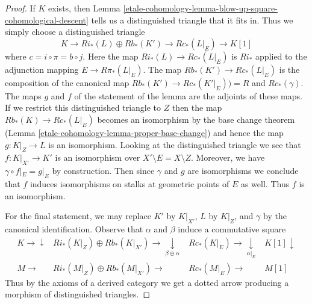 \begin{proof}
If $K$ exists, then Lemma \ref{etale-cohomology-lemma-blow-up-square-cohomological-descent}
tells us a distinguished triangle that it fits in. Thus we simply choose
a distinguished triangle
$$
K \to Ri_*(L) \oplus Rb_*(K') \to Rc_*(L|_E) \to K[1]
$$
where $c = i \circ \pi = b \circ j$. Here the map $Ri_*(L) \to Rc_*(L|_E)$
is $Ri_*$ applied to the adjunction mapping $E \to R\pi_*(L|_E)$.
The map $Rb_*(K') \to Rc_*(L|_E)$ is the composition of the canonical map
$Rb_*(K') \to Rc_*(K'|_E)) = R$ and $Rc_*(\gamma)$.
The maps $g$ and $f$ of the statement of the lemma are the adjoints
of these maps. If we restrict this distinguished triangle to $Z$
then the map $Rb_*(K) \to Rc_*(L|_E)$ becomes an isomorphism
by the base change theorem (Lemma \ref{etale-cohomology-lemma-proper-base-change}) and hence
the map $g : K|_Z \to L$ is an isomorphism.
Looking at the distinguished triangle we see that $f : K|_{X'} \to K'$
is an isomorphism over $X' \setminus E = X \setminus Z$.
Moreover, we have $\gamma \circ f|_E = g|_E$ by construction.
Then since $\gamma$ and $g$ are isomorphisms we conclude
that $f$ induces isomorphisms on stalks at geometric points of $E$
as well. Thus $f$ is an isomorphism.

\medskip\noindent
For the final statement, we may replace $K'$ by $K|_{X'}$,
$L$ by $K|_Z$, and $\gamma$ by the canonical identification.
Observe that $\alpha$ and $\beta$ induce a commutative square
$$
\begin{array}{cccc}K \longrightarrow\downarrow & Ri_*(K|_Z) \oplus Rb_*(K|_{X'}) \longrightarrow\underset{\beta \oplus \alpha}{\downarrow} & Rc_*(K|_E) \longrightarrow\underset{\alpha|_E}{\downarrow} & K[1] \downarrow \\ M \longrightarrow & Ri_*(M|_Z) \oplus Rb_*(M|_{X'}) \longrightarrow & Rc_*(M|_E) \longrightarrow & M[1]\end{array}
$$
Thus by the axioms of a derived category we get a dotted
arrow producing a morphism of distinguished triangles.
\end{proof}


